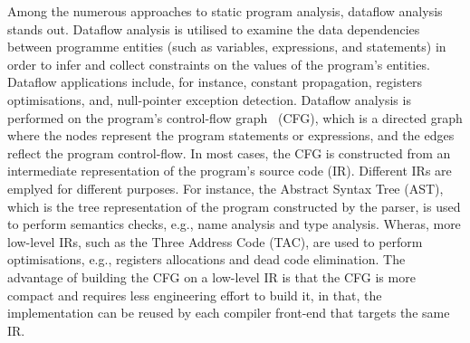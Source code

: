 Among the numerous approaches to static program analysis, dataflow analysis stands out.
Dataflow analysis is utilised to examine the data dependencies between programme entities
(such as variables, expressions, and statements) in order to infer and collect constraints
on the values of the program's entities. Dataflow applications include, for instance,
constant propagation, registers optimisations, and, null-pointer exception detection.
Dataflow analysis is performed on the program's control-flow graph~\cite{allen1970control} (CFG), which is a
directed graph where the nodes represent the program statements or expressions,
and the edges reflect the program control-flow. In most cases, the CFG is constructed 
from an intermediate representation of the program's source code (IR).
Different IRs are emplyed for different purposes. For instance, the Abstract Syntax Tree (AST), which
is the tree representation of the program constructed by the parser, is used to perform semantics checks, e.g.,
name analysis and type analysis. Wheras, more low-level IRs, such as the Three Address Code (TAC),
are used to perform optimisations, e.g., registers allocations and dead code elimination. The advantage
of building the CFG on a low-level IR is that the CFG is more compact and requires 
less engineering effort to build it, in that, the implementation can be reused by each 
compiler front-end that targets the same IR.







